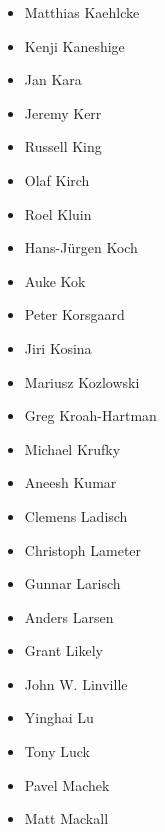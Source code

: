 \documentclass[a4paper,8pt,english]{sphinxmanual}
\begin{document}
\begin{itemize}
\item {} 
Matthias Kaehlcke

\item {} 
Kenji Kaneshige

\item {} 
Jan Kara

\item {} 
Jeremy Kerr

\item {} 
Russell King

\item {} 
Olaf Kirch

\item {} 
Roel Kluin

\item {} 
Hans-Jürgen Koch

\item {} 
Auke Kok

\item {} 
Peter Korsgaard

\item {} 
Jiri Kosina

\item {} 
Mariusz Kozlowski

\item {} 
Greg Kroah-Hartman

\item {} 
Michael Krufky

\item {} 
Aneesh Kumar

\item {} 
Clemens Ladisch

\item {} 
Christoph Lameter

\item {} 
Gunnar Larisch

\item {} 
Anders Larsen

\item {} 
Grant Likely

\item {} 
John W. Linville

\item {} 
Yinghai Lu

\item {} 
Tony Luck

\item {} 
Pavel Machek

\item {} 
Matt Mackall


\end{itemize}
\end{document}
